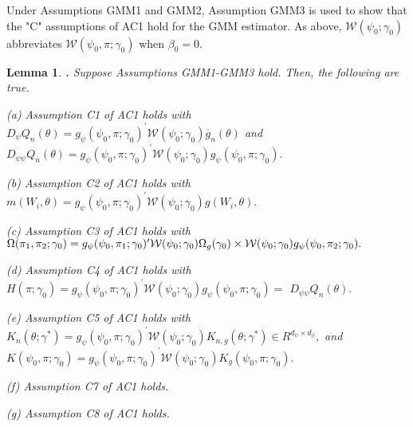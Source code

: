 \documentclass[12pt,titlepage,final,oneside,letterpaper]{article}
\newtheorem{lemma}{Lemma}[section]
\begin{document}
Under Assumptions GMM1 and GMM2, Assumption GMM3 is used to show that the
"C" assumptions of AC1 hold for the GMM estimator. As above, $\mathcal{W}%
(\psi _{0};\gamma _{0})$ abbreviates $\mathcal{W}(\psi _{0},\pi ;\gamma
_{0}) $ when $\beta _{0}=0.$

\begin{lemma}
\textbf{\hspace{-0.08in}.} \label{Lemma GMM suff condition C}Suppose
Assumptions \emph{GMM1-GMM3 }hold. Then, the following are true.

\noindent \emph{(a)} Assumption \emph{C1} of \emph{AC1} holds with $D_{\psi
}Q_{n}(\theta )=g_{\psi }(\psi _{0},\pi ;\gamma _{0})^{\prime }\mathcal{W}%
(\psi _{0};\gamma _{0})\overline{g}_{n}(\theta )$ and \newline
$D_{\psi \psi }Q_{n}(\theta )=g_{\psi }(\psi _{0},\pi ;\gamma _{0})^{\prime }%
\mathcal{W}(\psi _{0};\gamma _{0})g_{\psi }(\psi _{0},\pi ;\gamma _{0}).$

\noindent \emph{(b)} Assumption \emph{C2} of \emph{AC1 }holds with $%
m(W_{i},\theta )=g_{\psi }(\psi _{0},\pi ;\gamma _{0})^{\prime }\mathcal{W}%
(\psi _{0};\gamma _{0})g(W_{i},\theta ).$

\noindent \emph{(c)} Assumption \emph{C3} of \emph{AC1 }holds with $\Omega
(\pi _{1},\pi _{2};\gamma _{0})=g_{\psi }(\psi _{0},\pi _{1};\gamma
_{0})^{\prime }\mathcal{W}(\psi _{0};\gamma _{0})\Omega _{g}(\gamma _{0})%
\newline
\times \mathcal{W}(\psi _{0};\gamma _{0})g_{\psi }(\psi _{0},\pi _{2};\gamma
_{0}).$

\noindent \emph{(d)} Assumption \emph{C4} of \emph{AC1 }holds with $H(\pi
;\gamma _{0})=g_{\psi }(\psi _{0},\pi ;\gamma _{0})^{\prime }\mathcal{W}%
(\psi _{0};\gamma _{0})g_{\psi }(\psi _{0},\pi ;\gamma _{0})=$\newline
$D_{\psi \psi }Q_{n}(\theta ).$

\noindent \emph{(e)} Assumption \emph{C5} of \emph{AC1 }holds with $%
K_{n}(\theta ;\gamma ^{\ast })=g_{\psi }(\psi _{0},\pi ;\gamma _{0})^{\prime
}\mathcal{W}(\psi _{0};\gamma _{0})K_{n,g}(\theta ;\gamma ^{\ast })\in
R^{d_{\psi }\times d_{\beta }},$ and $K(\psi _{0},\pi ;\gamma _{0})=g_{\psi
}(\psi _{0},\pi ;\gamma _{0})^{\prime }\mathcal{W}(\psi _{0};\gamma
_{0})K_{g}(\psi _{0},\pi ;\gamma _{0}).$

\noindent \emph{(f) }Assumption \emph{C7} of \emph{AC1 }holds.

\noindent \emph{(g) }Assumption \emph{C8} of \emph{AC1 }holds.
\end{lemma}
\end{document}
